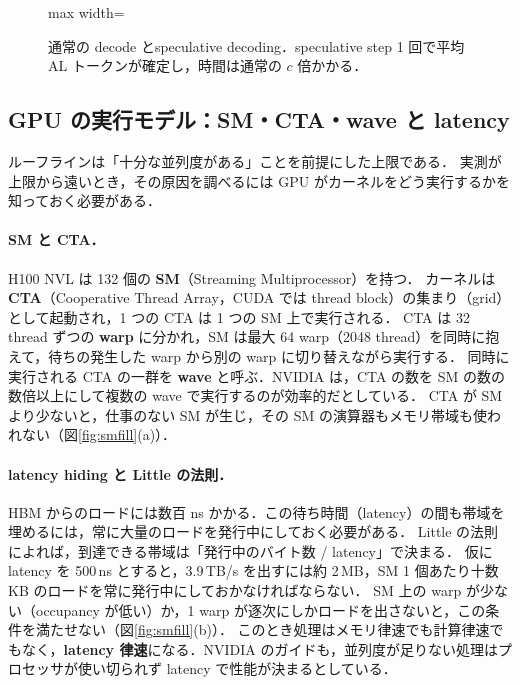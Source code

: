 \documentclass[a4paper,10pt]{ltjsarticle}
\begin{document}
\begin{figure}[htbp]\centering
\begin{adjustbox}{max width=\linewidth}\end{adjustbox}
\caption{通常の decode とspeculative decoding．speculative step 1 回で平均 AL トークンが確定し，時間は通常の $c$ 倍かかる．}
\label{fig:specdec}
\end{figure}

\subsection{GPU の実行モデル：SM・CTA・wave と latency}
\label{sec:gpu-model}
ルーフラインは「十分な並列度がある」ことを前提にした上限である．
実測が上限から遠いとき，その原因を調べるには GPU がカーネルをどう実行するかを知っておく必要がある\cite{nvperf,cudaguide}．

\paragraph{SM と CTA．}
H100 NVL は 132 個の \textbf{SM}（Streaming Multiprocessor）を持つ\cite{h100wp}．
カーネルは \textbf{CTA}（Cooperative Thread Array，CUDA では thread block）の集まり（grid）として起動され，1 つの CTA は 1 つの SM 上で実行される．
CTA は 32 thread ずつの \textbf{warp} に分かれ，SM は最大 64 warp（2048 thread）を同時に抱えて，待ちの発生した warp から別の warp に切り替えながら実行する．
同時に実行される CTA の一群を \textbf{wave} と呼ぶ．NVIDIA は，CTA の数を SM の数の数倍以上にして複数の wave で実行するのが効率的だとしている\cite{nvperf}．
CTA が SM より少ないと，仕事のない SM が生じ，その SM の演算器もメモリ帯域も使われない（図\ref{fig:smfill}(a)）．

\paragraph{latency hiding と Little の法則．}
HBM からのロードには数百 ns かかる．この待ち時間（latency）の間も帯域を埋めるには，常に大量のロードを発行中にしておく必要がある．
Little の法則によれば，到達できる帯域は「発行中のバイト数 / latency」で決まる\cite{volkov}．
仮に latency を 500\,ns とすると，3.9\,TB/s を出すには約 2\,MB，SM 1 個あたり十数 KB のロードを常に発行中にしておかなければならない．
SM 上の warp が少ない（occupancy が低い）か，1 warp が逐次にしかロードを出さないと，この条件を満たせない（図\ref{fig:smfill}(b)）．
このとき処理はメモリ律速でも計算律速でもなく，\textbf{latency 律速}になる．NVIDIA のガイドも，並列度が足りない処理はプロセッサが使い切られず latency で性能が決まるとしている\cite{nvperf}．
\end{document}
